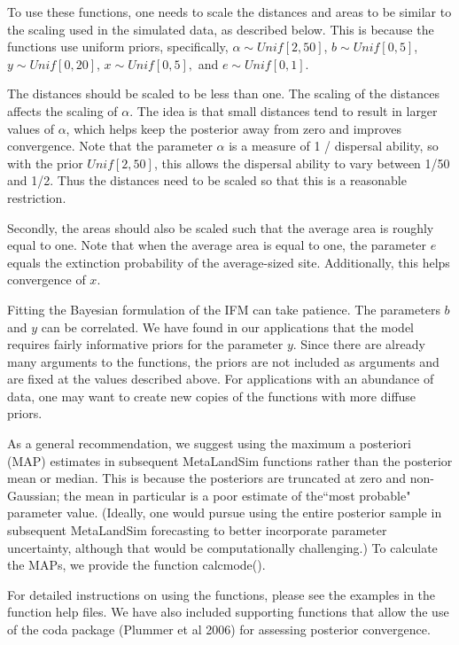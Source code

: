 \documentclass{article}\usepackage[]{graphicx}\usepackage[]{xcolor}
\begin{document}
To use these functions, one needs to scale the distances and areas to be similar to the scaling used in the simulated data, as described below. This is because the functions use uniform priors, specifically, $\alpha \sim Unif[2,50]$, $b \sim Unif[0,5]$, $y \sim Unif[0,20]$, $x \sim Unif[0,5],$ and $e \sim Unif[0,1]$.  

The distances should be scaled to be less than one. The scaling of the distances affects the scaling of $\alpha$. The idea is that small distances tend to result in larger values of $\alpha$, which helps keep the posterior away from zero and improves convergence. Note that the parameter $\alpha$ is a measure of 1 / dispersal ability, so with the prior $Unif[2,50]$, this allows the dispersal ability to vary between 1/50 and 1/2. Thus the distances need to be scaled so that this is a reasonable restriction. 

Secondly, the areas should also be scaled such that the average area is roughly equal to one. Note that when the average area is equal to one, the parameter $e$ equals the extinction probability of the average-sized site. Additionally, this helps convergence of $x$. 

Fitting the Bayesian formulation of the IFM can take patience. The parameters $b$ and $y$ can be correlated. We have found in our applications that the model requires fairly informative priors for the parameter $y$. Since there are already many arguments to the functions, the priors are not included as arguments and are fixed at the values described above. For applications with an abundance of data, one may want to create new copies of the functions with more diffuse priors. 

As a general recommendation, we suggest using the maximum a posteriori (MAP) estimates in subsequent MetaLandSim functions rather than the posterior mean or median. This is because the posteriors are truncated at zero and non-Gaussian; the mean in particular is a poor estimate of the``most probable" parameter value. (Ideally, one would pursue using the entire posterior sample in subsequent MetaLandSim forecasting to better incorporate parameter uncertainty, although that would be computationally challenging.) To calculate the MAPs, we provide the function calcmode(). 

For detailed instructions on using the functions, please see the examples in the function help files. We have also included supporting functions that allow the use of the coda package (Plummer et al 2006) for assessing posterior convergence. 
\end{document}
